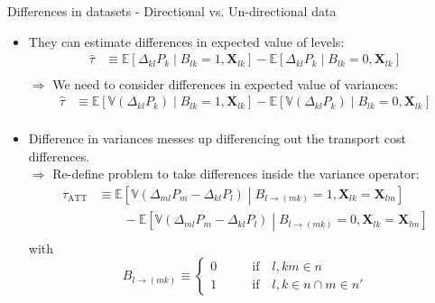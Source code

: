 \documentclass[aspectratio=169,10pt,hyperref={colorlinks,linkcolor={red!50!black},citecolor={blue!90!black},urlcolor={blue!80!black}},usenames,dvipsnames]{beamer}
\begin{document}
\begin{frame}{Differences in datasets - Directional vs. Un-directional data}
  \begin{itemize}
    \item<1-> They can estimate differences in expected value of levels:
    \vspace{-25pt}
    \begin{equation*}
      \begin{aligned}
        \hat{\tau} 
          &\equiv \mathbb{E}\left[\Delta_{kl}P_{k}\middle \vert B_{lk} = 1,\boldsymbol{X}_{lk} \right] 
              - \mathbb{E}\left[\Delta_{kl}P_{k}\middle \vert B_{lk} = 0,\boldsymbol{X}_{lk} \right] \\[-20pt]
      \end{aligned}
    \end{equation*}
    $\Longrightarrow$ We need to consider differences in expected value of variances: 
    \vspace{-25pt}
    \begin{equation*}
      \begin{aligned}
        \hat{\tau} 
          &\equiv \mathbb{E}\left[\mathbb{V}\left(\Delta_{kl}P_{k}\right)\middle \vert B_{lk} = 1,\boldsymbol{X}_{lk} \right] 
            - \mathbb{E}\left[\mathbb{V}\left(\Delta_{kl}P_{k}\right)\middle \vert B_{lk} = 0,\boldsymbol{X}_{lk} \right] \\[-20pt]
      \end{aligned}
    \end{equation*}
    \item<2-> Difference in variances messes up differencing out the transport cost differences. \\
    $\Longrightarrow$ Re-define problem to take differences inside the variance operator: 
    \vspace{-10pt}
    \begin{equation*}
      \begin{aligned}
        \tau_{\text{ATT}} 
          &\equiv  \mathbb{E}\left[\mathbb{V}\left(\Delta_{ml}P_{m} - \Delta_{kl}P_{l}\right)
                  \middle \vert B_{l \rightarrow (mk)} = 1,\boldsymbol{X}_{lk} = \boldsymbol{X}_{lm} \right] \\
            & \qquad - 
                \mathbb{E}\left[\mathbb{V}\left(\Delta_{ml}P_{m} - \Delta_{kl}P_{l}\right)
                \middle \vert B_{l \rightarrow (mk)} = 0,\boldsymbol{X}_{lk} = \boldsymbol{X}_{lm} \right]  \\[-15pt]
      \end{aligned}
    \end{equation*}
    with $$B_{l \rightarrow (mk)} \equiv \begin{cases} 0 \qquad &\text{if} \quad l,km \in n \\ 1 \qquad &\text{if} \quad l,k \in n \cap m \in n' \end{cases}$$
  \end{itemize}
\end{frame}
\end{document}

